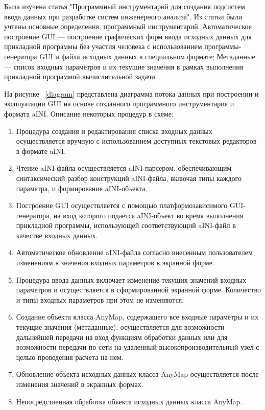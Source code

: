 \def\notedate{2022.09.29}
\def\currentauthor{Василян А.Р. (РК6-73Б)}

	Была изучена статья "Программный инструментарий для создания подсистем ввода данных при разработке систем инженерного анализа". Из статьи были учтены основные определения, программный инструментарий. Автоматическое построение GUI — построение графических форм ввода исходных данных для прикладной программы без участия человека с использованием программы-генератора GUI и файла исходных данных в специальном формате; Метаданные — список входных параметров и их текущие значения в рамках выполнения прикладной программой вычислительной задачи.

	На рисунке ~\ref{diagram} представлена диаграмма потока данных при построении и эксплуатации GUI на основе созданного программного инструментария и формата aINI. Описание некоторых процедур в схеме:
\begin{enumerate} [start=0]
	\item Процедура создания и редактирования списка входных данных осуществляется вручную с использованием доступных текстовых редакторов в формате aINI.
	\item Чтение aINI-файла осуществляется aINI-парсером, обеспечивающим синтаксический разбор конструкций aINI-файла, включая типы каждого параметра, и формирование aINI-объекта.
	\item Построение GUI осуществляется с помощью платформозависимого GUI-генератора, на вход которого подается aINI-объект во время выполнения прикладной программы, использующей соответствующий aINI-файл в качестве входных данных.
	\item Автоматическое обновление aINI-файла согласно внесенным пользователем изменениям в значения входных параметров в экранной форме. 
	\item Процедура ввода данных включает изменение текущих значений входных параметров и осуществляется в сформированной экранной форме. Количество и типы входных параметров при этом не изменяются.
	\item Создание объекта класса AnyMap, содержащего все входные параметры и их текущие значения (метаданные), осуществляется для возможности дальнейшей передачи на вход функциям обработки данных или для возможности передачи по сети на удаленный высокопроизводительный узел с целью проведения расчета на нем.
	\item Обновление объекта исходных данных класса AnyMap осуществляется после изменения значений в экранных формах.
	\item Непосредственная обработка объекта исходных данных класса AnyMap.
\end{enumerate}

